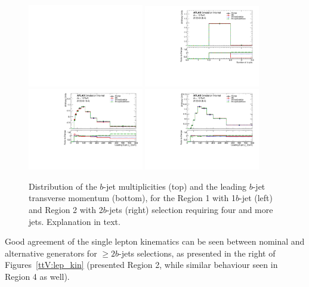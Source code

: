 \begin{figure}[!htb]
\centering
\includegraphics[width=0.45\textwidth]{Plots/ttV/dummy}
\includegraphics[width=0.45\textwidth]{Plots/ttV/shape/c_Region_1_nBtagJets}\\
\includegraphics[width=0.45\textwidth]{Plots/ttV/shape/c_Region_0_Bjet_Pt_0}
\includegraphics[width=0.45\textwidth]{Plots/ttV/shape/c_Region_1_Bjet_Pt_0}\\
  \caption{Distribution of the $b$-jet multiplicities (top) and the leading $b$-jet transverse momentum (bottom), for the Region 1 with 1$b$-jet (left) and Region 2 with 2$b$-jets (right) selection requiring four and more jets. Explanation in text. \label{ttV:4jbinfo}}
\end{figure}

Good agreement of the single lepton kinematics can be seen between nominal and alternative generators for $\geq2b$-jets selections, as presented in the right of Figures~\ref{ttV:lep_kin} (presented Region 2, while similar behaviour seen in Region 4 as well). 

